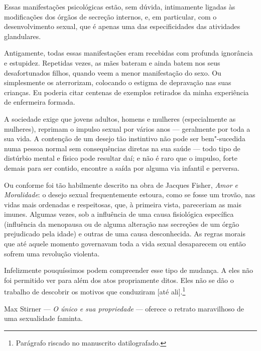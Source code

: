 Essas manifestações psicológicas estão, sem dúvida, intimamente ligadas
às modificações dos órgãos de secreção internos, e, em particular, com o
desenvolvimento sexual, que é apenas uma das especificidades das atividades
glandulares.

Antigamente, todas essas manifestações eram recebidas com profunda
ignorância e estupidez. Repetidas vezes, as mães bateram e ainda batem
nos seus desafortunados filhos, quando veem a menor manifestação do
sexo. Ou simplesmente os aterrorizam, colocando o estigma de depravação nas suas
crianças. Eu poderia citar centenas de exemplos retirados da minha
experiência de enfermeira formada.

A sociedade exige que jovens adultos, homens e mulheres (especialmente
as mulheres), reprimam o impulso sexual por vários anos --- geralmente
por toda a sua vida. A contenção de um desejo tão instintivo não pode
ser bem"-sucedida numa pessoa normal sem consequências diretas na sua
saúde --- todo tipo de distúrbio mental e físico pode resultar daí; e não
é raro que o impulso, forte demais para ser contido, encontre a saída
por alguma via infantil e perversa.


Ou conforme foi tão habilmente descrito na obra de Jacques Fisher,
\emph{Amor e Moralidade}: o desejo sexual frequentemente estoura, como
se fosse um trovão, nas vidas mais ordenadas e respeitosas, que, à
primeira vista, pareceriam as mais imunes. Algumas vezes, sob a
influência de uma causa fisiológica específica (influência da menopausa
ou de alguma alteração nas secreções de um órgão prejudicado pela idade)
e outras de uma causa desconhecida. As regras morais que até aquele
momento governavam toda a vida sexual desaparecem ou então sofrem uma
revolução violenta.

Infelizmente pouquíssimos podem compreender esse tipo de mudança. A eles não foi permitido
ver para além dos atos propriamente ditos. Eles não se dão o trabalho de
descobrir os motivos que conduziram {[}até ali{]}.\footnote{Parágrafo
  riscado no manuscrito datilografado.}


Max Stirner --- \emph{O único e sua propriedade} --- oferece o retrato
maravilhoso de uma sexualidade faminta.

